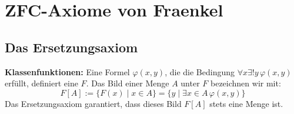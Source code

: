 \section{ZFC-Axiome von Fraenkel}

\subsection{Das Ersetzungsaxiom}

\begin{math-stroke}
\begin{axioms}
\end{axioms}

\textbf{Klassenfunktionen:}
Eine Formel $\varphi(x, y)$, die die Bedingung $\forall x \exists! y \, \varphi(x, y)$ erfüllt, definiert eine  $F$. Das Bild einer Menge $A$ unter $F$ bezeichnen wir mit:
\[
F[A] := \{ F(x) \mid x \in A \} = \{ y \mid \exists x \in A \, \varphi(x, y) \}
\]
Das Ersetzungsaxiom garantiert, dass dieses Bild $F[A]$ stets eine Menge ist.
\end{math-stroke}

